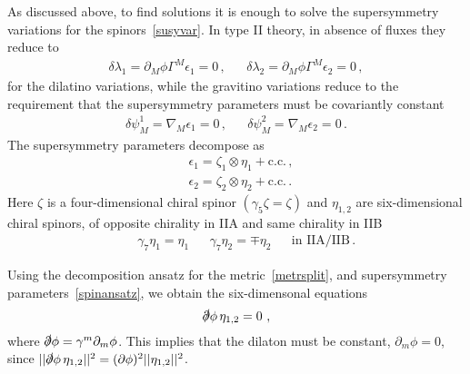 \documentclass[debug]{phd}
\begin{document}
				
				As discussed above, to find solutions it is enough to solve the supersymmetry variations for the spinors~\eqref{susyvar}.
				In type II theory, in absence of fluxes they reduce to 
						\begin{equation}
							\begin{array}{lcr}
								\delta \lambda_1 = \partial_M \phi \Gamma^M \epsilon_1 = 0 \, , & & \delta \lambda_2 = \partial_M \phi \Gamma^M \epsilon_2 = 0 \, ,
							\end{array}
						\end{equation}
				for the dilatino variations, while the gravitino variations reduce to the requirement that the supersymmetry parameters must be covariantly constant
						\begin{equation}\label{grav0}
							\begin{array}{lcr}
								\delta \psi^1_{M} = \nabla_M \epsilon_1 = 0 \, , & & \delta \psi^2_{M} = \nabla_M \epsilon_2 = 0 \, .
							\end{array}
						\end{equation}
				The supersymmetry parameters decompose as 
						\begin{align}\label{spinansatz}
							& \epsilon_1 = \zeta_1 \otimes \eta_1 + \text{c.c.} \, , \\
							& \epsilon_2 = \zeta_2 \otimes \eta_2 + \text{c.c.} \, .
						\end{align}
				Here $\zeta$ is a four-dimensional chiral spinor $(\gamma_5\zeta=\zeta)$ and $\eta_{1,2}$ are six-dimensional chiral spinors, of opposite chirality in IIA and same chirality in IIB
						\begin{align}
							& &	\gamma_7\eta_{1}=\eta_{1} & & \gamma_7\eta_{2}=\mp\eta_2 & & \mbox{in IIA/IIB} \, .
						\end{align}					
					
				Using the decomposition ansatz for the metric~\eqref{metrsplit}, and supersymmetry parameters~\eqref{spinansatz}, we obtain the six-dimensonal equations
\begin{equation}\label{intdilCY}
\slashed{\partial} \phi\,\eta_{1,2}=0\ ,
\end{equation}
where $\slashed{\partial}\phi=\gamma^m\partial_m\phi$. This implies that the dilaton must be constant, $\partial_m\phi=0$, since $||\slashed{\partial}\phi\,\eta_{1,2}||^2=(\partial\phi)^2||\eta_{1,2}||^2$.
\end{document}
